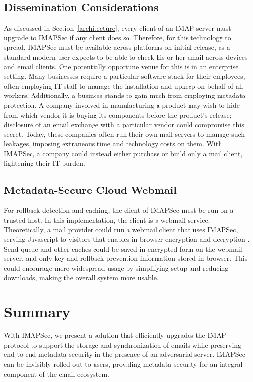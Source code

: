 \documentclass[pageno]{jpaper}
\newcommand{\project}{IMAPSec }
\newcommand{\projectnospace}{IMAPSec}
\begin{document}
\subsection{Dissemination Considerations}

As discussed in Section~\ref{architecture}, every client of an IMAP server must upgrade to \project if any client does so. Therefore, for this technology to spread, \project must be available across platforms on initial release, as a standard modern user expects to be able to check his or her email across devices and email clients. One potentially opportune venue for this is in an enterprise setting. Many businesses require a particular software stack for their employees, often employing IT staff to manage the installation and upkeep on behalf of all workers. Additionally, a business stands to gain much from employing metadata protection. A company involved in manufacturing a product may wish to hide from which vendor it is buying its components before the product's release; disclosure of an email exchange with a particular vendor could compromise this secret. Today, these companies often run their own mail servers to manage such leakages, imposing extraneous time and technology costs on them. With \projectnospace, a company could instead either purchase or build only a mail client, lightening their IT burden.

\subsection{Metadata-Secure Cloud Webmail}

For rollback detection and caching, the client of \project must be run on a trusted host. In this implementation, the client is a webmail service. Theoretically, a mail provider could run a webmail client that uses \projectnospace, serving Javascript to visitors that enables in-browser encryption and decryption \cite{wagner}. Send queue and other caches could be saved in encrypted form on the webmail server, and only key and rollback prevention information stored in-browser. This could encourage more widespread usage by simplifying setup and reducing downloads, making the overall system more usable.

\section{Summary}
With \projectnospace, we present a solution that efficiently upgrades the IMAP protocol to support the storage and synchronization of emails while preserving end-to-end metadata security in the presence of an adversarial server. \project can be invisibly rolled out to users, providing metadata security for an integral component of the email ecosystem.
\end{document}
